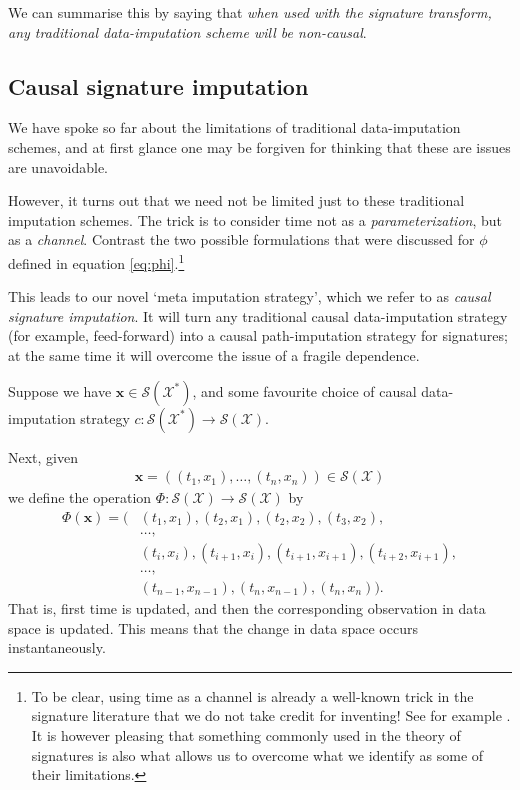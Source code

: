 \documentclass{article}
\newcommand{\dataspace}{\mathcal{X}}
\newcommand{\seriesspace}{\mathcal{S}}
\begin{document}
We can summarise this by saying that \emph{when used with the signature transform, any traditional data-imputation scheme will be non-causal}.

\subsection{Causal signature imputation}
We have spoke so far about the limitations of traditional data-imputation schemes, and at first glance one may be forgiven for thinking that these are issues are unavoidable. 

However, it turns out that we need not be limited just to these traditional imputation schemes. The trick is to consider time not as a \emph{parameterization}, but as a \emph{channel}. Contrast the two possible formulations that were discussed for $\phi$ defined in equation \eqref{eq:phi}.\footnote{To be clear, using time as a channel is already a well-known trick in the signature literature that we do not take credit for inventing! See for example \cite[Definition A.3]{kidger2019deep}. It is however pleasing that something commonly used in the theory of signatures is also what allows us to overcome what we identify as some of their limitations.}

This leads to our novel `meta imputation strategy', which we refer to as \emph{causal signature imputation}. It will turn any traditional causal data-imputation strategy (for example, feed-forward) into a causal path-imputation strategy for signatures; at the same time it will overcome the issue of a fragile dependence.

Suppose we have $\mathbf{x} \in \seriesspace(\dataspace^*)$, and some favourite choice of causal data-imputation strategy $c \colon \seriesspace(\dataspace^*) \to \seriesspace(\dataspace)$.

Next, given
\begin{align*}
    \mathbf{x} = ((t_1, x_1), \ldots, (t_n, x_n)) \in \seriesspace(\dataspace)
\end{align*}
we define the operation $\Phi \colon \seriesspace(\dataspace) \to \seriesspace(\dataspace)$ by
\begin{align}
    \Phi(\mathbf{x}) = (&(t_1, x_1), (t_2, x_1), (t_2, x_2),(t_3, x_2),\nonumber\\
    &\ldots,\nonumber\\
    &(t_i, x_i), (t_{i + 1}, x_i), (t_{i + 1}, x_{i + 1}), (t_{i + 2}, x_{i + 1}),\nonumber\\
    &\ldots,\nonumber\\
    &(t_{n - 1}, x_{n - 1}), (t_n, x_{n - 1}),(t_n, x_n)).\label{eq:causalsig}
\end{align}
That is, first time is updated, and then the corresponding observation in data space is updated. This means that the change in data space occurs instantaneously.
\end{document}
